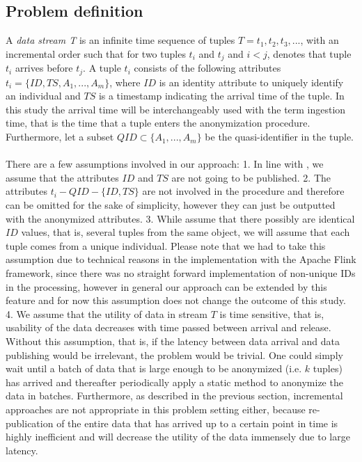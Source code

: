 \subsection{Problem definition}
A \textit{data stream T} is an infinite time sequence of tuples $T = t_1, t_2, t_3, ...$, with an incremental order such that for two tuples $t_i$ and $t_j$ and $i < j$, denotes that tuple $t_i$ arrives before $t_j$. A tuple $t_i$ consists of the following attributes $t_i = \{ID, TS, A_1, ..., A_m\}$, where $ID$ is an identity attribute to uniquely identify an individual and $TS$ is a timestamp indicating the arrival time of the tuple. In this study the arrival time will be interchangeably used with the term ingestion time, that is the time that a tuple enters the anonymization procedure. Furthermore, let a subset $QID \subset \{A_1, ..., A_m\}$ be the quasi-identifier in the tuple.\\
\\
There are a few assumptions involved in our approach:
1. In line with , we assume that the attributes $ID$ and $TS$ are not going to be published. 2. The attributes $t_i - QID - \{ID, TS\}$ are not involved in the procedure and therefore can be omitted for the sake of simplicity, however they can just be outputted with the anonymized attributes. 3. While  assume that there possibly are identical $ID$ values, that is, several tuples from the same object, we will assume that each tuple comes from a unique individual. Please note that we had to take this assumption due to technical reasons in the implementation with the Apache Flink framework, since there was no straight forward implementation of non-unique IDs in the processing, however in general our approach can be extended by this feature and for now this assumption does not change the outcome of this study. 4. We assume that the utility of data in stream $T$ is time sensitive, that is, usability of the data decreases with time passed between arrival and release. Without this assumption, that is, if the latency between data arrival and data publishing would be irrelevant, the problem would be trivial. One could simply wait until a batch of data that is large enough to be anonymized (i.e. $k$ tuples) has arrived and thereafter periodically apply a static method to anonymize the data in batches. Furthermore, as described in the previous section, incremental approaches are not appropriate in this problem setting either, because re-publication of the entire data that has arrived up to a certain point in time is highly inefficient and will decrease the utility of the data immensely due to large latency.\\
